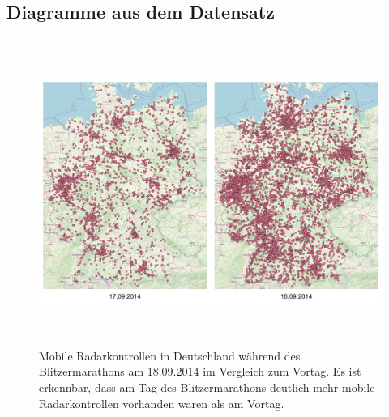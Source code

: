 \subsection{Diagramme aus dem Datensatz}
\label{sec:AnhangDiagramme}

\begin{figure}[h]
    \centering
    \includegraphics[width=1.0\textwidth,height=10cm,keepaspectratio=true]{content/images/BlitzerMarathonSep2014Vgl.jpeg}
    \caption{Mobile Radarkontrollen in Deutschland während des Blitzermarathons am 18.09.2014 im Vergleich zum Vortag.
    Es ist erkennbar, dass am Tag des Blitzermarathons deutlich mehr mobile Radarkontrollen vorhanden waren als am Vortag.}
    \label{fig:BlitzerMarathonSep2014Vgl}
\end{figure}
